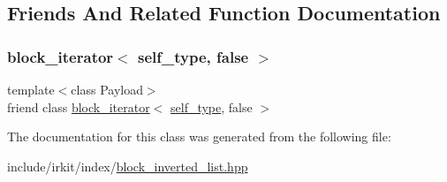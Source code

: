 \subsection{Friends And Related Function Documentation}
\mbox{\label{classirk_1_1index_1_1block__payload__list__view_a88a9a271d334c6a1ee36182f15227581}} 
\subsubsection{\texorpdfstring{block\+\_\+iterator$<$ self\+\_\+type, false $>$}{block\_iterator< self\_type, false >}}
{\footnotesize\ttfamily template$<$class Payload$>$ \\
friend class \mbox{\hyperlink{classirk_1_1index_1_1block__iterator}{block\+\_\+iterator}}$<$ \mbox{\hyperlink{classirk_1_1index_1_1block__payload__list__view_a29e1995bbc64a8512bacf6c110f24f9e}{self\+\_\+type}}, false $>$\hspace{0.3cm}{\ttfamily [friend]}}



The documentation for this class was generated from the following file\+:\begin{DoxyCompactItemize}
\item 
include/irkit/index/\mbox{\hyperlink{block__inverted__list_8hpp}{block\+\_\+inverted\+\_\+list.\+hpp}}\end{DoxyCompactItemize}
